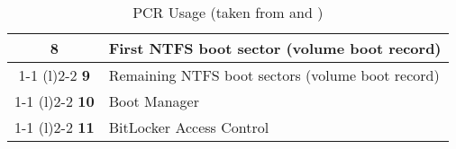 \begin{table}
\begin{tabular}{cp{30em}}
        \multirow{2}{*}{\textbf{8}}                     & First \ac{NTFS} boot sector (volume boot record)                                                         \\
        \cmidrule[0.4pt](r){1-1}
        \cmidrule[0.4pt](l){2-2}
        \textbf{9}                                      & Remaining \ac{NTFS} boot sectors (volume boot record)                                                    \\
        \cmidrule[0.4pt](r){1-1}
        \cmidrule[0.4pt](l){2-2}
        \textbf{10}                                     & Boot Manager                                                                                             \\
        \cmidrule[0.4pt](r){1-1}
        \cmidrule[0.4pt](l){2-2}
        \textbf{11}                                     & BitLocker Access Control                                                                                 \\
        \bottomrule
    \end{tabular}%
    \caption{\ac{PCR} Usage (taken from \cite[Table 1]{tcg-pc-client-platform-firmware-profile-spec} and \cite[Table 9-2]{windows-internals-6-part2})}%
    \label{tab:pcr-usage}%
\end{table}